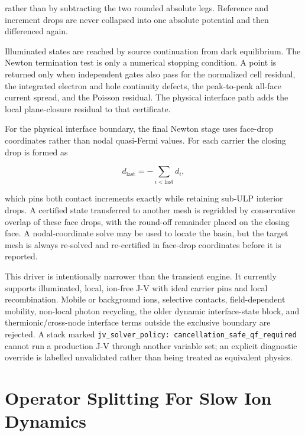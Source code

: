 \documentclass[
  11pt,
  american,
]{report}
\begin{document}
rather than by subtracting the two rounded absolute legs. Reference and
increment drops are never collapsed into one absolute potential and then
differenced again.

Illuminated states are reached by source continuation from dark
equilibrium. The Newton termination test is only a numerical stopping
condition. A point is returned only when independent gates also pass for
the normalized cell residual, the integrated electron and hole
continuity defects, the peak-to-peak all-face current spread, and the
Poisson residual. The physical interface path adds the local
plane-closure residual to that certificate.

For the physical interface boundary, the final Newton stage uses
face-drop coordinates rather than nodal quasi-Fermi values. For each
carrier the closing drop is formed as

\[
d_{\mathrm{last}}=-\sum_{i<\mathrm{last}}d_i,
\]

which pins both contact increments exactly while retaining sub-ULP
interior drops. A certified state transferred to another mesh is
regridded by conservative overlap of these face drops, with the
round-off remainder placed on the closing face. A nodal-coordinate solve
may be used to locate the basin, but the target mesh is always re-solved
and re-certified in face-drop coordinates before it is reported.

This driver is intentionally narrower than the transient engine. It
currently supports illuminated, local, ion-free J-V with ideal carrier
pins and local recombination. Mobile or background ions, selective
contacts, field-dependent mobility, non-local photon recycling, the
older dynamic interface-state block, and thermionic/cross-node interface
terms outside the exclusive boundary are rejected. A stack marked
\texttt{jv\_solver\_policy:\ cancellation\_safe\_qf\_required} cannot
run a production J-V through another variable set; an explicit
diagnostic override is labelled unvalidated rather than being treated as
equivalent physics.

\hypertarget{operator-splitting-for-slow-ion-dynamics}{%
\section{Operator Splitting For Slow Ion
Dynamics}\label{operator-splitting-for-slow-ion-dynamics}}
\end{document}
